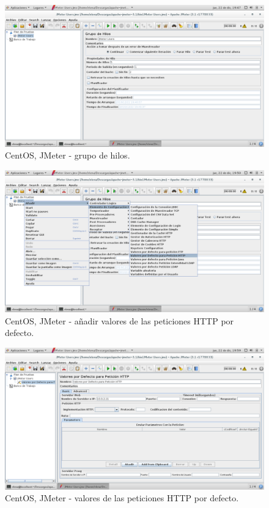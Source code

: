 \begin{figure}[H] 
	\centering
	\includegraphics[width=14.7cm]{./img/ejercicio4_3.png} 	
	\caption{CentOS, JMeter - grupo de hilos.} \label{fig:ejercicio4_3}
\end{figure}

\begin{figure}[H] 
	\centering
	\includegraphics[width=14.7cm]{./img/ejercicio4_4.png} 	
	\caption{CentOS, JMeter - añadir valores de las peticiones HTTP por defecto.} \label{fig:ejercicio4_4}
\end{figure}

\begin{figure}[H] 
	\centering
	\includegraphics[width=14.7cm]{./img/ejercicio4_5.png} 	
	\caption{CentOS, JMeter - valores de las peticiones HTTP por defecto.} \label{fig:ejercicio4_5}
\end{figure}

